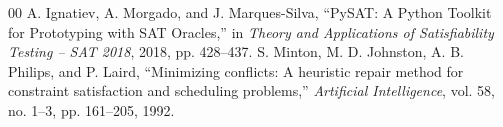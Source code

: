 \documentclass[conference]{IEEEtran}
\begin{document}
\begin{thebibliography}{00}
     A. Ignatiev, A. Morgado, and J. Marques-Silva, ``PySAT: A Python Toolkit for Prototyping with SAT Oracles,'' in \emph{Theory and Applications of Satisfiability Testing -- SAT 2018}, 2018, pp. 428--437.
     S. Minton, M. D. Johnston, A. B. Philips, and P. Laird, ``Minimizing conflicts: A heuristic repair method for constraint satisfaction and scheduling problems,'' \emph{Artificial Intelligence}, vol. 58, no. 1--3, pp. 161--205, 1992.
\end{thebibliography}
\end{document}
